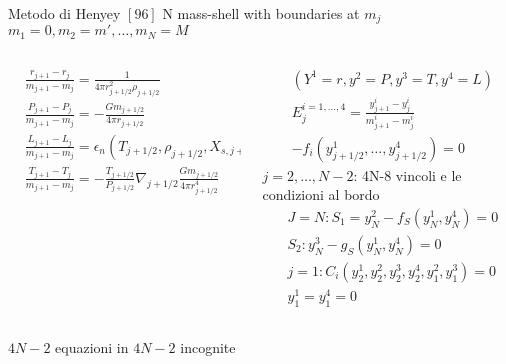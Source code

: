 \begin{frame}{Metodo di Henyey $[96]$}
N mass-shell with boundaries at $m_j$ $m_1=0,m_2=m',\ldots,m_N=M$
\begin{columns}[T]
\begin{column}{0.5\textwidth}
\begin{align*}
&\frac{r_{j+1}-r_j}{m_{j+1}-m_j}=\frac{1}{4\pi r_{j+1/2}^2\rho_{j+1/2}}\\
&\frac{P_{j+1}-P_j}{m_{j+1}-m_j}=-\frac{Gm_{j+1/2}}{4\pi r_{j+1/2}}\\
&\frac{L_{j+1}-L_j}{m_{j+1}-m_j}=\epsilon_n(T_{j+1/2},\rho_{j+1/2},X_{s,j+1/2})+!!!\\
&\frac{T_{j+1}-T_j}{m_{j+1}-m_j}=-\frac{T_{j+1/2}}{P_{j+1/2}}\nabla_{j+1/2}\frac{Gm_{j+1/2}}{4\pi r^4_{j+1/2}}
\end{align*}
\end{column}
\begin{column}{0.5\textwidth}
\begin{align*}
&(Y^1=r, y^2=P, y^3=T, y^4=L)\\
&E_j^{i=1,\ldots,4}=\frac{y_{j+1}^i-y^i_j}{m_{j+1}^i-m^i_j}\\
&-f_i(y_{j+1/2}^1,\ldots,y_{j+1/2}^4)=0
\end{align*}
$j=2,\ldots,N-2$: 4N-8 vincoli e le condizioni al bordo
\begin{align*}
&J=N: S_1=y_N^2-f_S(y_N^1,y_N^4)=0\\
&S_2:y^3_N-g_S(y_N^1,y_N^4)=0\\
&j=1: C_i(y^1_2,y_2^2,y_2^3,y_2^4,y_1^2,y_1^3)=0\\
&y_1^1=y_1^4=0
\end{align*}
\end{column}
\end{columns}
$4N-2$ equazioni in $4N-2$ incognite
\end{frame}

